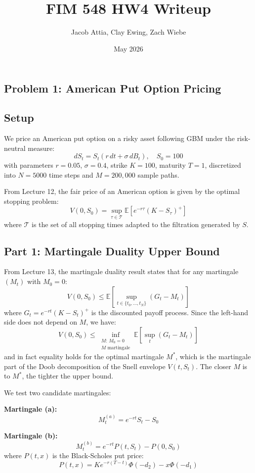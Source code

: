 \documentclass{article}
\title{FIM 548 HW4 Writeup}
\author{Jacob Attia, Clay Ewing, Zach Wiebe}
\date{May 2026}
\begin{document}
\maketitle
\subsection*{Problem 1: American Put Option Pricing}
\subsection*{Setup}

We price an American put option on a risky asset following GBM under the risk-neutral measure:
\[
dS_t = S_t(r\,dt + \sigma\,dB_t), \quad S_0 = 100
\]
with parameters $r = 0.05$, $\sigma = 0.4$, strike $K = 100$, maturity $T = 1$, discretized into $N = 5000$ time steps and $M = 200{,}000$ sample paths.

From Lecture 12, the fair price of an American option is given by the optimal stopping problem:
\[
V(0, S_0) = \sup_{\tau \in \mathcal{T}} \mathbb{E}\left[e^{-r\tau}(K - S_\tau)^+\right]
\]
where $\mathcal{T}$ is the set of all stopping times adapted to the filtration generated by $S$.

\subsection*{Part 1: Martingale Duality Upper Bound}

From Lecture 13, the martingale duality result states that for any martingale $(M_t)$ with $M_0 = 0$:
\[
V(0, S_0) \leq \mathbb{E}\left[\sup_{t \in \{t_0, \ldots, t_N\}} \left(G_t - M_t\right)\right]
\]
where $G_t = e^{-rt}(K - S_t)^+$ is the discounted payoff process. Since the left-hand side does not depend on $M$, we have:
\[
V(0, S_0) \leq \inf_{\substack{M:\, M_0=0 \\ M \text{ martingale}}} \mathbb{E}\left[\sup_t (G_t - M_t)\right]
\]
and in fact equality holds for the optimal martingale $M^*$, which is the martingale part of the Doob decomposition of the Snell envelope $V(t, S_t)$. The closer $M$ is to $M^*$, the tighter the upper bound.

We test two candidate martingales:

\textbf{Martingale (a):}
\[
M_t^{(a)} = e^{-rt}S_t - S_0
\]


\textbf{Martingale (b):} 
\[
M_t^{(b)} = e^{-rt}P(t, S_t) - P(0, S_0)
\]
where $P(t, x)$ is the Black-Scholes put price:
\[
P(t, x) = Ke^{-r(T-t)}\Phi(-d_2) - x\Phi(-d_1)
\]
\end{document}
